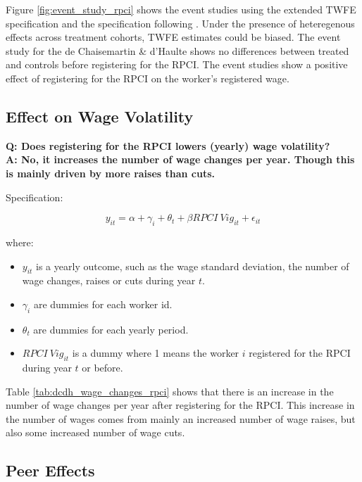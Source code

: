 \documentclass[oneside,11pt]{article}
\begin{document}
Figure \ref{fig:event_study_rpci} shows the event studies using the extended TWFE specification and the specification following \cite{de2020two}. Under the presence of heteregenous effects across treatment cohorts, TWFE estimates could be biased. The event study for the de Chaisemartin \& d'Haulte shows no differences between treated and controls before registering for the RPCI. The event studies show a positive effect of registering for the RPCI on the worker's registered wage. 

\clearpage

\subsection{Effect on Wage Volatility} \label{subsec:wage_changes}

\textbf{Q: Does registering for the RPCI lowers (yearly) wage volatility?}
\\
\textbf{A: No, it increases the number of wage changes per year. Though this is mainly driven by more raises than cuts.}

Specification:

$$y_{it} = \alpha + \gamma_{i} + \theta_{t} + \beta RPCI\ Vig_{it} + \epsilon_{it}$$

where:

\begin{itemize}
    \item $y_{it}$ is a yearly outcome, such as the wage standard deviation, the number of wage changes, raises or cuts during year $t$.
    \item $\gamma_{i}$ are dummies for each worker id.
    \item $\theta_{t}$ are dummies for each yearly period.
    \item $RPCI\ Vig_{it}$ is a dummy where 1 means the worker $i$ registered for the RPCI during year $t$ or before.
\end{itemize}

Table \ref{tab:dcdh_wage_changes_rpci} shows that there is an increase in the number of wage changes per year after registering for the RPCI. This increase in the number of wages comes from mainly an increased number of wage raises, but also some increased number of wage cuts. 

\clearpage

\subsection{Peer Effects} \label{subsec:peer}
\end{document}
